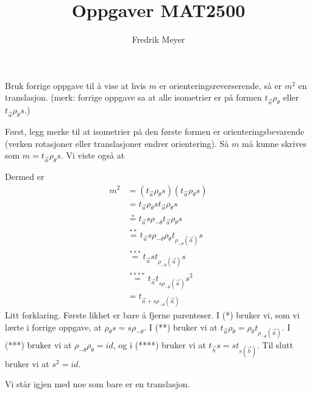 \documentclass[11pt, norsk]{article}
\begin{document}
\title{Oppgaver MAT2500}
\author{Fredrik Meyer}
\maketitle 

\begin{oppg}
Bruk forrige oppgave til å vise at hvis $m$ er orienteringsreverserende, så er $m^2$ en translasjon. (merk: forrige oppgave sa at alle isometrier er på formen $t_{\vec a} \rho_\theta$ eller $t_{\vec a} \rho_\theta s$.)
\end{oppg}
\begin{losn}
Først, legg merke til at isometrier på den første formen er orienteringsbevarende (verken rotasjoner eller translasjoner endrer orientering). Så $m$ må kunne skrives som $m=t_{\vec a} \rho_\theta s$. Vi viste også at 

Dermed er
\begin{align*}
m^2 &= (t_{\vec a} \rho_\theta s)(t_{\vec a} \rho_\theta s) \\
&= t_{\vec a} \rho_\theta s t_{\vec a} \rho_\theta s \\
&\stackrel{*}{=} t_{\vec a} s \rho_{-\theta} t_{\vec a} \rho_\theta s \\
&\stackrel{**}{=} t_{\vec a} s \rho_{-\theta} \rho_{\theta}t_{\rho_{-\theta}(\vec a)} s \\
&\stackrel{***}{=} t_{\vec a} s t_{\rho_{-\theta}(\vec a)} s \\
&\stackrel{****}{=} t_{\vec a} t_{s\rho_{-\theta}(\vec a)} s^2 \\
&= t_{\vec a + s\rho_{-\theta}(\vec a)} 
\end{align*}
Litt forklaring. Første likhet er bare å fjerne parenteser. I (*) bruker vi, som vi lærte i forrige oppgave, at $\rho_\theta s = s \rho_{-\theta}$. I (**) bruker vi at $t_{\vec a} \rho_\theta = \rho_\theta t_{\rho_{-\theta}(\vec a)}$. I (***) bruker vi at $\rho_{-\theta}\rho_\theta=id$, og i (****) bruker vi at $t_{\vec b}s = s t_{s(\vec b)}$. Til slutt bruker vi at $s^2=id$.

Vi står igjen med noe som bare er en translasjon.
\end{losn}
\end{document}

